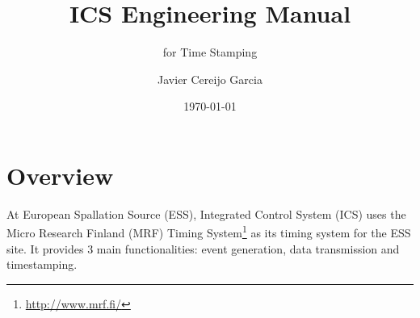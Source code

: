 \documentclass[11pt
  , a4paper
  , article
  , oneside
  , showtrims
]{memoir}
\begin{document}


\date{\today}




\title{ICS Engineering Manual}
\subtitle{for Time Stamping}
\author{Javier Cereijo Garcia}



\showtrimson

\esstitle
\newpage
\tableofcontents
\newpage



\chapter{Overview}
At European Spallation Source (ESS), Integrated Control System (ICS) uses the Micro Research Finland (MRF) Timing System{\footnote{\url{http://www.mrf.fi/}}} as its timing system for the ESS site. It provides 3 main functionalities: event generation, data transmission and timestamping.
\end{document}

